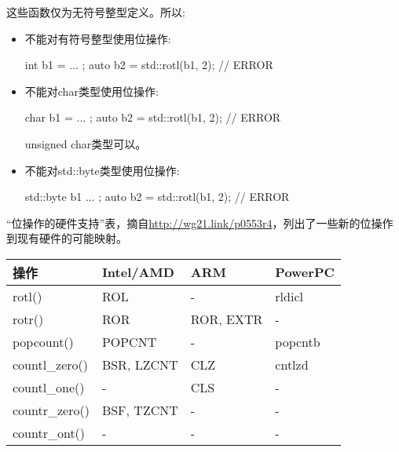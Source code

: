 这些函数仅为无符号整型定义。所以:

\begin{itemize}
\item
不能对有符号整型使用位操作:

\begin{cpp}
int b1 = ... ;
auto b2 = std::rotl(b1, 2); // ERROR
\end{cpp}

\item
不能对char类型使用位操作:

\begin{cpp}
char b1 = ... ;
auto b2 = std::rotl(b1, 2); // ERROR
\end{cpp}

unsigned char类型可以。

\item
不能对std::byte类型使用位操作:

\begin{cpp}
std::byte b1{ ... };
auto b2 = std::rotl(b1, 2); // ERROR
\end{cpp}

\end{itemize}

“位操作的硬件支持”表，摘自\url{http://wg21.link/p0553r4}，列出了一些新的位操作到现有硬件的可能映射。

\begin{longtable}[c]{|l|l|l|l|}
\hline
\textbf{操作} & \textbf{Intel/AMD} & \textbf{ARM} & \textbf{PowerPC} \\ \hline
\endfirsthead
%
\endhead
%
rotl()             & ROL                & -            & rldicl           \\ \hline
rotr()             & ROR                & ROR, EXTR    & -                \\ \hline
popcount()         & POPCNT             & -            & popcntb          \\ \hline
countl\_zero()     & BSR, LZCNT         & CLZ          & cntlzd           \\ \hline
countl\_one()      & -                  & CLS          & -                \\ \hline
countr\_zero()     & BSF, TZCNT         & -            & -                \\ \hline
countr\_ont()      & -                  & -            & -                \\ \hline
\end{longtable}

